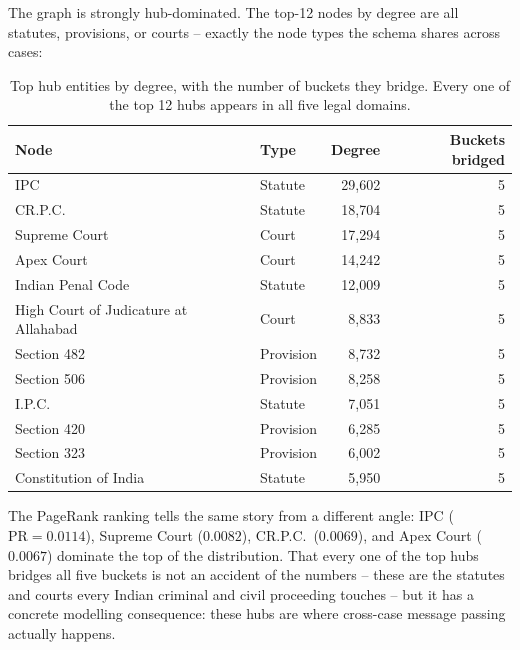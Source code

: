 The graph is strongly hub-dominated. The top-12 nodes by degree are
all statutes, provisions, or courts -- exactly the node types the
schema shares across cases:

\begin{table}[H]
  \centering
  \small
  \begin{tabular}{llrr}
    \toprule
    Node & Type & Degree & Buckets bridged \\
    \midrule
    IPC                                   & Statute   & 29{,}602 & 5 \\
    CR.P.C.                               & Statute   & 18{,}704 & 5 \\
    Supreme Court                         & Court     & 17{,}294 & 5 \\
    Apex Court                            & Court     & 14{,}242 & 5 \\
    Indian Penal Code                     & Statute   & 12{,}009 & 5 \\
    High Court of Judicature at Allahabad & Court     &  8{,}833 & 5 \\
    Section 482                           & Provision &  8{,}732 & 5 \\
    Section 506                           & Provision &  8{,}258 & 5 \\
    I.P.C.                                & Statute   &  7{,}051 & 5 \\
    Section 420                           & Provision &  6{,}285 & 5 \\
    Section 323                           & Provision &  6{,}002 & 5 \\
    Constitution of India                 & Statute   &  5{,}950 & 5 \\
    \bottomrule
  \end{tabular}
  \caption{Top hub entities by degree, with the number of buckets they
  bridge. Every one of the top 12 hubs appears in all five legal
  domains.}
  \label{tab:top_hubs}
\end{table}

The PageRank ranking tells the same story from a different angle:
IPC ($\text{PR}=0.0114$), Supreme Court ($0.0082$), CR.P.C.\
($0.0069$), and Apex Court ($0.0067$) dominate the top of the
distribution. That every one of the top hubs bridges all five buckets
is not an accident of the numbers -- these are the statutes and
courts every Indian criminal and civil proceeding touches -- but it
has a concrete modelling consequence: these hubs are where cross-case
message passing actually happens.

